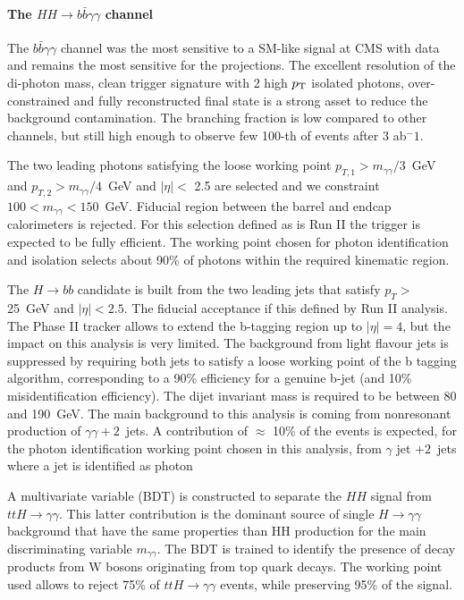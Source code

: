 \paragraph{The $HH \rightarrow b\bar{b}\gamma\gamma$ channel}

The $b\bar{b}\gamma\gamma$ channel was the most sensitive to a SM-like signal at CMS with data \cite{CMS_PAS_HIG_17-030} and remains the most sensitive for the projections. 
The excellent resolution of the di-photon mass, clean trigger signature with 2 high $p_{\rm T}$ isolated photons, over-constrained and fully reconstructed final state is a strong asset to reduce the background contamination. The branching fraction is low compared to other channels, but still high enough to observe few 100-th of events after 3 ab$^-1$.

The two leading photons satisfying the loose working point $p_{T,1} > m_{\gamma\gamma}/3$~GeV and $p_{T,2} > m_{\gamma\gamma}/4$~GeV and $|\eta| <$ 2.5 are selected 
and we constraint $ 100 < m_{\gamma\gamma} < 150$~GeV. Fiducial region between the barrel and endcap calorimeters is rejected. For this selection defined as is Run II \cite{???} the trigger is expected to be fully efficient.
The working point chosen for photon identification and isolation selects about 90\% of photons within the required kinematic region. 

The $H \rightarrow bb$ candidate is built from the two leading jets that satisfy $p_T >$ 25~GeV and $|\eta| < 2.5$. The fiducial acceptance if this defined by Run II analysis. The Phase II tracker allows to extend the b-tagging region up to $|\eta| = 4$, but the impact on this analysis is very limited.
The background from light flavour jets is suppressed by requiring both jets to satisfy a loose working point of the  b tagging algorithm, corresponding to a 90\% efficiency for a genuine b-jet (and 10\% misidentification efficiency). The dijet invariant mass is required to be between 80 and 190~GeV. 
The main background to this analysis is coming from nonresonant production of $\gamma\gamma + 2$~jets. A contribution of $\approx$ 10\% of the events is expected, for the photon identification working point chosen in this analysis, from 
$\gamma$ jet $+ 2$~jets where a jet is identified as photon 

A multivariate variable (BDT) is constructed to separate the $HH$ signal from $ttH \rightarrow \gamma\gamma$. This latter contribution is the dominant source of single $H \rightarrow \gamma\gamma$ background that have the same properties than HH production for the main discriminating variable $m_{\gamma\gamma}$. The BDT is trained to identify the presence of decay products from W bosons originating from top quark decays. The working point used allows to reject 75\% of $ttH \rightarrow \gamma\gamma$ events, while preserving 95\% of the signal.

